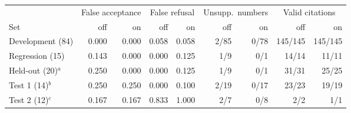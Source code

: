\begin{tabular}{@{}lrrrrrrrr@{}}
\toprule
& \multicolumn{2}{c}{False acceptance} & \multicolumn{2}{c}{False refusal} & \multicolumn{2}{c}{Unsupp.\ numbers} & \multicolumn{2}{c}{Valid citations} \\
\cmidrule(lr){2-3}\cmidrule(lr){4-5}\cmidrule(lr){6-7}\cmidrule(lr){8-9}
Set & off & on & off & on & off & on & off & on \\
\midrule
Development (84) & 0.000 & 0.000 & 0.058 & 0.058 & 2/85 & 0/78 & 145/145 & 145/145 \\
Regression (15) & 0.143 & 0.000 & 0.000 & 0.125 & 1/9 & 0/1 & 14/14 & 11/11 \\
Held-out (20)$^a$ & 0.250 & 0.000 & 0.000 & 0.125 & 1/9 & 0/1 & 31/31 & 25/25 \\
Test 1 (14)$^b$ & 0.250 & 0.250 & 0.000 & 0.100 & 2/19 & 0/17 & 23/23 & 19/19 \\
Test 2 (12)$^c$ & 0.167 & 0.167 & 0.833 & 1.000 & 2/7 & 0/8 & 2/2 & 1/1 \\
\bottomrule
\end{tabular}